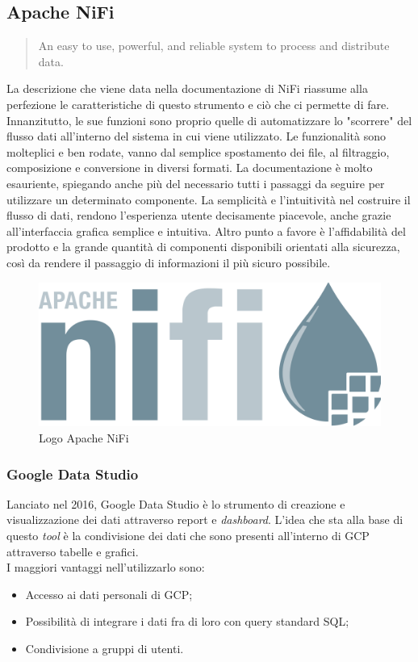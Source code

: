 \subsection{Apache NiFi}
\begin{quotation}
An easy to use, powerful, and reliable system to process and distribute data.
\end{quotation}
La descrizione che viene data nella documentazione di NiFi \cite{NiFi} riassume alla perfezione le caratteristiche di questo strumento e ciò che ci permette di fare.
\\
Innanzitutto, le sue funzioni sono proprio quelle di automatizzare lo "scorrere" del flusso dati all'interno del sistema in cui viene utilizzato. Le funzionalità sono molteplici e ben rodate, vanno dal semplice spostamento dei file, al filtraggio, composizione e conversione in diversi formati. La documentazione è molto esauriente, spiegando anche più del necessario tutti i passaggi da seguire per utilizzare un determinato componente. La semplicità e l'intuitività nel costruire il flusso di dati, rendono l'esperienza utente decisamente piacevole, anche grazie all'interfaccia grafica semplice e intuitiva. Altro punto a favore è l'affidabilità del prodotto e la grande quantità di componenti disponibili orientati alla sicurezza, così da rendere il passaggio di informazioni il più sicuro possibile.
\begin{figure}[h!]
	\centering
	\includegraphics[scale=0.1]{figures/apache-nifi-logo}
	\caption[Logo Apache NiFi.]{Logo Apache NiFi
		\label{fig:LogoApacheNiFi}}
\end{figure}
\subsubsection{Google Data Studio}
Lanciato nel 2016, Google Data Studio è lo strumento di creazione e visualizzazione dei dati attraverso report e \emph{dashboard}. L'idea che sta alla base di questo \emph{tool} è la condivisione dei dati che sono presenti all'interno di GCP attraverso tabelle e grafici.
\\ I maggiori vantaggi nell'utilizzarlo sono:
\begin{itemize}
	\item Accesso ai dati personali di GCP;
	\item Possibilità di integrare i dati fra di loro con query standard SQL;
	\item Condivisione a gruppi di utenti. 
\end{itemize}

